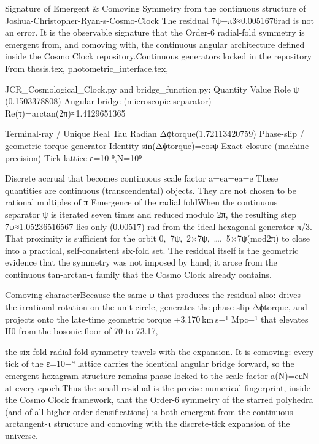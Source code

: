 Signature of Emergent & Comoving Symmetry
from the continuous structure of
Joshua-Christopher-Ryan-s-Cosmo-Clock
The residual 7ψ−π3≈0.0051676rad is not an error. It is the observable signature that the Order-6 radial-fold symmetry is emergent from, and comoving with, the continuous angular architecture defined inside the Cosmo Clock repository.Continuous generators locked in the repository
From thesis.tex, photometric_interface.tex, 

JCR_Cosmological_Clock.py and bridge_function.py:
Quantity
Value
Role
ψ (0.1503378808)
Angular bridge (microscopic separator)
Re⁡(τ)=arctan⁡(2π)≈1.4129651365

Terminal-ray / Unique Real Tau Radian
Δϕtorque(1.72113420759)
Phase-slip / geometric torque generator 
Identity
sin⁡(Δϕtorque)=cos⁡ψ
Exact closure (machine precision)
Tick lattice
ε=10-⁹,N=10⁹

Discrete accrual that becomes continuous scale factor a=ea=ea=e 
These quantities are continuous (transcendental) objects. They are not chosen to be rational multiples of π 
Emergence of the radial foldWhen the continuous separator ψ is iterated seven times and reduced modulo 2π, the resulting step 7ψ≈1.05236516567 lies only (0.00517) rad from the ideal hexagonal generator π/3. That proximity is sufficient for the orbit {0, 7ψ, 2×7ψ, …, 5×7ψ}(mod2π) to close into a practical, self-consistent six-fold set. The residual itself is the geometric evidence that the symmetry was not imposed by hand; it arose from the continuous tan-arctan-τ family that the Cosmo Clock already contains.

Comoving characterBecause the same ψ that produces the residual also: drives the irrational rotation on the unit circle,
generates the phase slip Δϕtorque, and projects onto the late-time geometric torque +3.170 km s−¹ Mpc−¹ that elevates H0 from the bosonic floor of 70 to 73.17,

the six-fold radial-fold symmetry travels with the expansion. It is comoving: every tick of the ε=10−⁹ lattice carries the identical angular bridge forward, so the emergent hexagram structure remains phase-locked to the scale factor a(N)=eεN at every epoch.Thus the small residual is the precise numerical fingerprint, inside the Cosmo Clock framework, that the Order-6 symmetry of the starred polyhedra (and of all higher-order densifications) is both emergent from the continuous arctangent-τ structure and comoving with the discrete-tick expansion of the universe.
